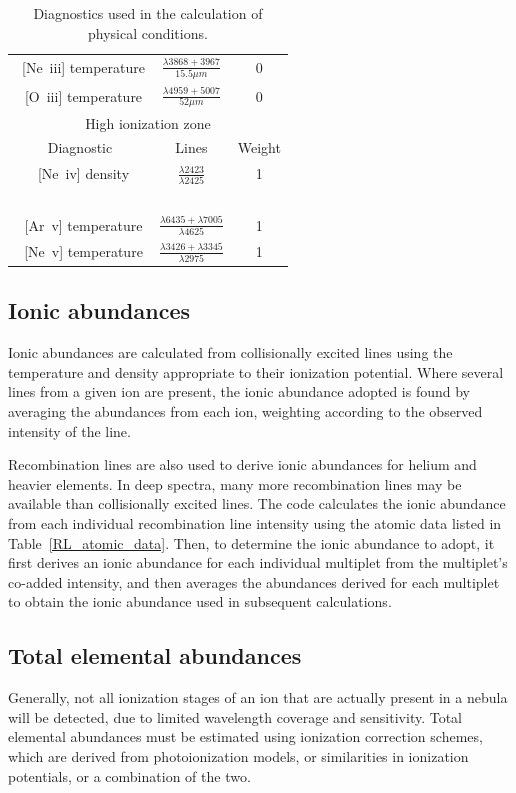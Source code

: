 \documentclass[useAMS,usenatbib]{mn2e}
\begin{document}
\begin{table}
\begin{tabular}{ccc}
~[Ne~{\sc iii}] temperature & $\frac{\lambda 3868 + 3967}{15.5 \mu m}$ & 0\\
~[O~{\sc iii}] temperature & $\frac{\lambda 4959 + 5007}{52 \mu m}$ & 0\\
\hline
\multicolumn{3}{c}{High ionization zone}\\
\hline
Diagnostic & Lines & Weight \\
~[Ne~{\sc iv}] density & $\frac{\lambda2423}{\lambda2425}$ & 1 \\
~\\
~[Ar~{\sc v}] temperature & $\frac{\lambda 6435 + \lambda7005}{\lambda4625}$ & 1 \\
~[Ne~{\sc v}] temperature & $\frac{\lambda 3426 + \lambda3345}{\lambda2975}$ & 1 \\
\end{tabular}
\caption{Diagnostics used in the calculation of physical conditions.}
\label{zonestable}
\end{table}

\subsection{Ionic abundances}

Ionic abundances are calculated from collisionally excited lines using the temperature and density appropriate to their ionization potential.  Where several lines from a given ion are present, the ionic abundance adopted is found by averaging the abundances from each ion, weighting according to the observed intensity of the line.

Recombination lines are also used to derive ionic abundances for helium and heavier elements.  In deep spectra, many more recombination lines may be available than collisionally excited lines.  The code calculates the ionic abundance from each individual recombination line intensity using the atomic data listed in Table~\ref{RL_atomic_data}.  Then, to determine the ionic abundance to adopt, it first derives an ionic abundance for each individual multiplet from the multiplet's co-added intensity, and then averages the abundances derived for each multiplet to obtain the ionic abundance used in subsequent calculations.

\subsection{Total elemental abundances}

Generally, not all ionization stages of an ion that are actually present in a nebula will be detected, due to limited wavelength coverage and sensitivity.  Total elemental abundances must be estimated using ionization correction schemes, which are derived from photoionization models, or similarities in ionization potentials, or a combination of the two.
\end{document}
